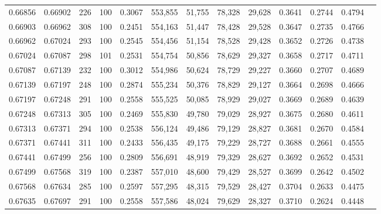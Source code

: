 \begin{tabular}{rrrrrrrrrrrrr}
0.66856 & 0.66902 &   226 & 100 &                                     0.3067 & 553,855 &  51,755 &  78,328 &  29,628 & 0.3641 & 0.2744 & 0.4794 \\
0.66903 & 0.66962 &   308 & 100 &                                     0.2451 & 554,163 &  51,447 &  78,428 &  29,528 & 0.3647 & 0.2735 & 0.4766 \\
0.66962 & 0.67024 &   293 & 100 &                                     0.2545 & 554,456 &  51,154 &  78,528 &  29,428 & 0.3652 & 0.2726 & 0.4738 \\
0.67024 & 0.67087 &   298 & 101 &                                     0.2531 & 554,754 &  50,856 &  78,629 &  29,327 & 0.3658 & 0.2717 & 0.4711 \\
0.67087 & 0.67139 &   232 & 100 &                                     0.3012 & 554,986 &  50,624 &  78,729 &  29,227 & 0.3660 & 0.2707 & 0.4689 \\
0.67139 & 0.67197 &   248 & 100 &                                     0.2874 & 555,234 &  50,376 &  78,829 &  29,127 & 0.3664 & 0.2698 & 0.4666 \\
0.67197 & 0.67248 &   291 & 100 &                                     0.2558 & 555,525 &  50,085 &  78,929 &  29,027 & 0.3669 & 0.2689 & 0.4639 \\
0.67248 & 0.67313 &   305 & 100 &                                     0.2469 & 555,830 &  49,780 &  79,029 &  28,927 & 0.3675 & 0.2680 & 0.4611 \\
0.67313 & 0.67371 &   294 & 100 &                                     0.2538 & 556,124 &  49,486 &  79,129 &  28,827 & 0.3681 & 0.2670 & 0.4584 \\
0.67371 & 0.67441 &   311 & 100 &                                     0.2433 & 556,435 &  49,175 &  79,229 &  28,727 & 0.3688 & 0.2661 & 0.4555 \\
0.67441 & 0.67499 &   256 & 100 &                                     0.2809 & 556,691 &  48,919 &  79,329 &  28,627 & 0.3692 & 0.2652 & 0.4531 \\
0.67499 & 0.67568 &   319 & 100 &                                     0.2387 & 557,010 &  48,600 &  79,429 &  28,527 & 0.3699 & 0.2642 & 0.4502 \\
0.67568 & 0.67634 &   285 & 100 &                                     0.2597 & 557,295 &  48,315 &  79,529 &  28,427 & 0.3704 & 0.2633 & 0.4475 \\
0.67635 & 0.67697 &   291 & 100 &                                     0.2558 & 557,586 &  48,024 &  79,629 &  28,327 & 0.3710 & 0.2624 & 0.4448 \\

\end{tabular}
